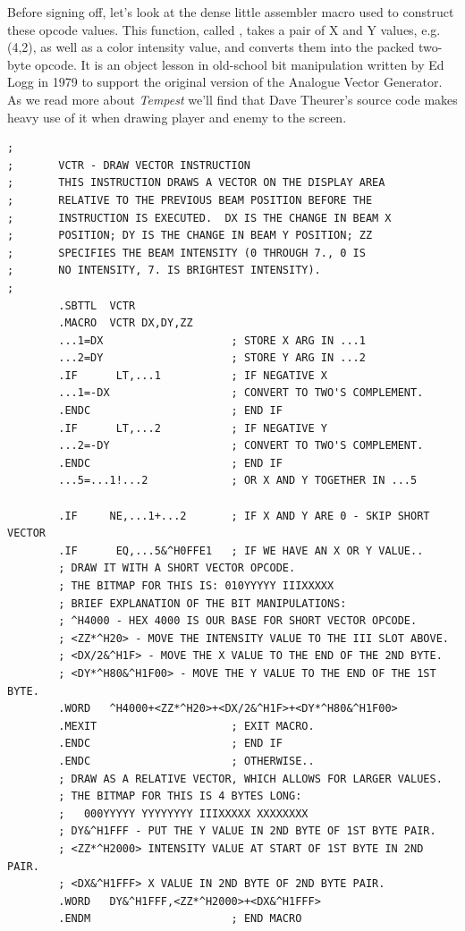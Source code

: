 Before signing off, let's look at the dense little assembler macro used to construct these opcode
values. This function, called , takes a pair of X and Y values, e.g. (4,2), as well as a color intensity value,
and converts them into the packed two-byte opcode. It is an object lesson in old-school bit
manipulation written by Ed Logg in 1979 to support the original version of the Analogue Vector
Generator. As we read more about \textit{Tempest} we'll find that Dave Theurer's source code
makes heavy use of it when drawing player and enemy to the screen.

\begin{lstlisting}
;
;       VCTR - DRAW VECTOR INSTRUCTION
;       THIS INSTRUCTION DRAWS A VECTOR ON THE DISPLAY AREA
;       RELATIVE TO THE PREVIOUS BEAM POSITION BEFORE THE
;       INSTRUCTION IS EXECUTED.  DX IS THE CHANGE IN BEAM X
;       POSITION; DY IS THE CHANGE IN BEAM Y POSITION; ZZ 
;       SPECIFIES THE BEAM INTENSITY (0 THROUGH 7., 0 IS
;       NO INTENSITY, 7. IS BRIGHTEST INTENSITY).
;
        .SBTTL  VCTR
        .MACRO  VCTR DX,DY,ZZ
        ...1=DX                    ; STORE X ARG IN ...1
        ...2=DY                    ; STORE Y ARG IN ...2
        .IF      LT,...1           ; IF NEGATIVE X
        ...1=-DX                   ; CONVERT TO TWO'S COMPLEMENT.
        .ENDC                      ; END IF
        .IF      LT,...2           ; IF NEGATIVE Y
        ...2=-DY                   ; CONVERT TO TWO'S COMPLEMENT.
        .ENDC                      ; END IF
        ...5=...1!...2             ; OR X AND Y TOGETHER IN ...5
    
        .IF     NE,...1+...2       ; IF X AND Y ARE 0 - SKIP SHORT VECTOR
        .IF      EQ,...5&^H0FFE1   ; IF WE HAVE AN X OR Y VALUE..
        ; DRAW IT WITH A SHORT VECTOR OPCODE.
        ; THE BITMAP FOR THIS IS: 010YYYYY IIIXXXXX
        ; BRIEF EXPLANATION OF THE BIT MANIPULATIONS:
        ; ^H4000 - HEX 4000 IS OUR BASE FOR SHORT VECTOR OPCODE.
        ; <ZZ*^H20> - MOVE THE INTENSITY VALUE TO THE III SLOT ABOVE.
        ; <DX/2&^H1F> - MOVE THE X VALUE TO THE END OF THE 2ND BYTE.
        ; <DY*^H80&^H1F00> - MOVE THE Y VALUE TO THE END OF THE 1ST BYTE.
        .WORD   ^H4000+<ZZ*^H20>+<DX/2&^H1F>+<DY*^H80&^H1F00>
        .MEXIT                     ; EXIT MACRO.
        .ENDC                      ; END IF
        .ENDC                      ; OTHERWISE..
        ; DRAW AS A RELATIVE VECTOR, WHICH ALLOWS FOR LARGER VALUES.
        ; THE BITMAP FOR THIS IS 4 BYTES LONG:
        ;   000YYYYY YYYYYYYY IIIXXXXX XXXXXXXX
        ; DY&^H1FFF - PUT THE Y VALUE IN 2ND BYTE OF 1ST BYTE PAIR.
        ; <ZZ*^H2000> INTENSITY VALUE AT START OF 1ST BYTE IN 2ND PAIR.
        ; <DX&^H1FFF> X VALUE IN 2ND BYTE OF 2ND BYTE PAIR.
        .WORD   DY&^H1FFF,<ZZ*^H2000>+<DX&^H1FFF>
        .ENDM                      ; END MACRO
\end{lstlisting}
